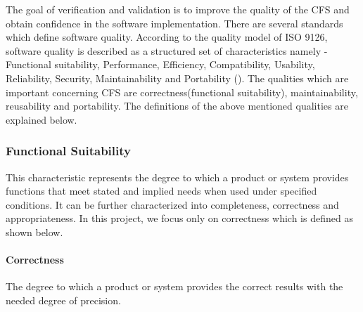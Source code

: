 \documentclass[12pt, titlepage]{article}
\newcommand{\famname}{CFS} %
\begin{document}
The goal of verification and validation is to improve the quality of the
\famname{} and obtain confidence in the software implementation. There are 
several standards which define software quality. According to the quality model 
of ISO 9126, software quality is described as a structured set of 
characteristics namely - Functional suitability, Performance, Efficiency, 
Compatibility, Usability, Reliability, Security, Maintainability and 
Portability (\cite{ISO9126}). The qualities which are important concerning 
\famname{} are correctness(functional suitability), maintainability, 
reusability and portability. The definitions of the above mentioned qualities 
are explained below.


\subsubsection {Functional Suitability}

This characteristic represents the degree to which a product or system provides
functions that meet stated and implied needs when used under specified
conditions. It can be further characterized into completeness, correctness and
appropriateness. In this project, we focus only on correctness which is defined
as shown below.

\paragraph{Correctness }   The degree to which a product or
system provides the correct results with the needed degree of precision.
\end{document}
